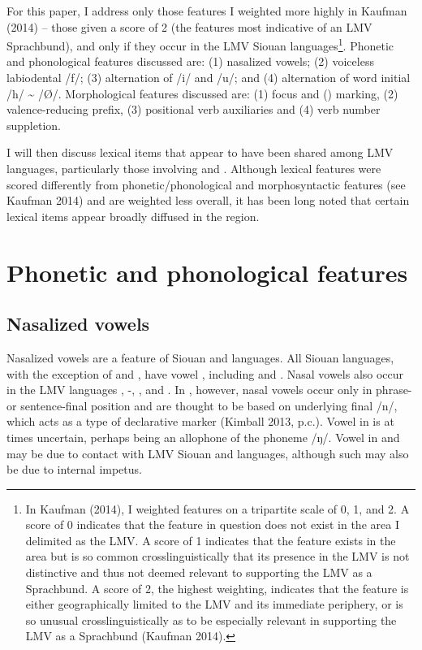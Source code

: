 \documentclass[output=paper]{LSP/langsci}
\begin{document}
For this paper, I address only those features I weighted more highly in Kaufman (2014) -- those given a score of 2 (the features most indicative of an LMV Sprachbund), and only if they occur in the LMV Siouan languages\footnote{In Kaufman (2014), I weighted features on a tripartite scale of 0, 1, and 2. A score of 0 indicates that the feature in question does not exist in the area I delimited as the LMV. A score of 1 indicates that the feature exists in the area but is so common crosslinguistically that its presence in the LMV is not distinctive and thus not deemed relevant to supporting the LMV as a Sprachbund. A score of 2, the highest weighting, indicates that the feature is either geographically limited to the LMV and its immediate periphery, or is so unusual crosslinguistically as to be especially relevant in supporting the LMV as a Sprachbund (Kaufman 2014).}. Phonetic and phonological features discussed are: (1) nasalized vowels; (2) voiceless labiodental  /f/; (3) alternation of /i/ and /u/; and (4) alternation of word initial /h/ \textasciitilde{} /Ø/. Morphological features discussed are: (1) focus and  () marking, (2) valence-reducing prefix, (3) positional verb auxiliaries and (4) verb number suppletion. 

I will then discuss lexical items that appear to have been shared among LMV languages, particularly those involving  and . Although lexical features were scored differently from phonetic/phonological and morphosyntactic features (see Kaufman 2014) and are weighted less overall, it has been long noted that certain lexical items appear broadly diffused in the region. 

\section{Phonetic and phonological features}

\subsection{Nasalized vowels}

Nasalized vowels are a feature of Siouan and  languages. All Siouan languages, with the exception of  and , have vowel , including  and . Nasal vowels also occur in the LMV languages , -, , and . In , however, nasal vowels occur only in phrase- or sentence-final position and are thought to be based on underlying final /n/, which acts as a type of declarative marker (Kimball 2013, p.c.). Vowel  in  is at times uncertain, perhaps being an allophone of the phoneme /ŋ/. Vowel  in  and  may be due to contact with LMV Siouan and  languages, although such  may also be due to internal impetus.
\end{document}
